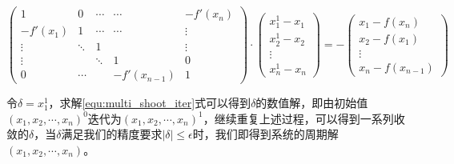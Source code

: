 \begin{equation}
    \begin{pmatrix}
        1        & 0      & \cdots & \cdots & -f'(x_n) \\
        -f'(x_1) & 1      & \cdots & \cdots & \vdots   \\
        \vdots   & \ddots & 1      &        & \vdots   \\
        \vdots   &        & \ddots &  1  &  0       \\
        0        & \cdots &        & -f'(x_{n-1})&1
    \end{pmatrix}\cdot
    \begin{pmatrix}
        x_1^1-x_1\\
        x_2^1-x_2\\
        \vdots \\
        x_n^1-x_n
    \end{pmatrix}=-
    \begin{pmatrix}
        x_1-f(x_n)\\
        x_2-f(x_1)\\
        \vdots\\
        x_n-f(x_{n-1})
    \end{pmatrix}\label{equ:multi_shoot_iter}
\end{equation}

令$\delta=x_1^1$，求解\eqref{equ:multi_shoot_iter}式可以得到$\delta$的数值解，即由初始值$(x_1,x_2,\cdots,x_n)^0$迭代为$(x_1,x_2,\cdots,x_n)^1$，继续重复上述过程，可以得到一系列收敛的$\delta$，当$\delta$满足我们的精度要求$|\delta|\leqslant\epsilon$时，我们即得到系统的周期解$(x_1,x_2,\cdots,x_n)$。

